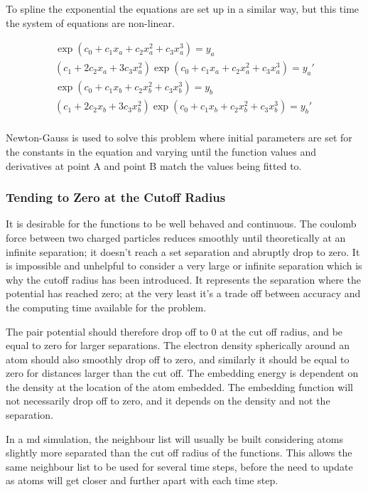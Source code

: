 To spline the exponential the equations are set up in a similar way, but this time the system of equations are non-linear.

\begin{equation}
\begin{split}
\exp(c_0 + c_1 x_a + c_2 x_a^2 + c_3 x_a^3) = y_a \\
(c_1 + 2 c_2 x_a + 3 c_3 x_a^2)\exp(c_0 + c_1 x_a + c_2 x_a^2 + c_3 x_a^3) = y_a' \\
\exp(c_0 + c_1 x_b + c_2 x_b^2 + c_3 x_b^3) = y_b \\
(c_1 + 2 c_2 x_b + 3 c_3 x_b^2)\exp(c_0 + c_1 x_b + c_2 x_b^2 + c_3 x_b^3) = y_b' \\
\end{split}
\label{eq:cubicExpSpline}
\end{equation}

Newton-Gauss is used to solve this problem where initial parameters are set for the constants in the equation and varying until the function values and derivatives at point A and point B match the values being fitted to.


\subsubsection{Tending to Zero at the Cutoff Radius}
\label{section:tendingtozero}

It is desirable for the functions to be well behaved and continuous.  The coulomb force between two charged particles reduces smoothly until theoretically at an infinite separation; it doesn't reach a set separation and abruptly drop to zero.  It is impossible and unhelpful to consider a very large or infinite separation which is why the cutoff radius has been introduced.  It represents the separation where the potential has reached zero; at the very least it's a trade off between accuracy and the computing time available for the problem.

The pair potential should therefore drop off to 0 at the cut off radius, and be equal to zero for larger separations.  The electron density spherically around an atom should also smoothly drop off to zero, and similarly it should be equal to zero for distances larger than the cut off.  The embedding energy is dependent on the density at the location of the atom embedded.  The embedding function will not necessarily drop off to zero, and it depends on the density and not the separation.

In a \acrshort{md} simulation, the neighbour list will usually be built considering atoms slightly more separated than the cut off radius of the functions.  This allows the same neighbour list to be used for several time steps, before the need to update as atoms will get closer and further apart with each time step.  



